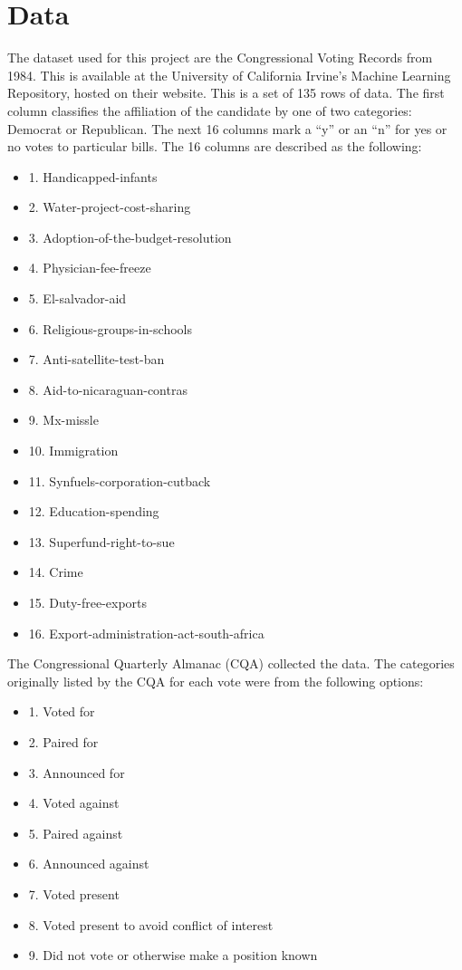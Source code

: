 \documentclass{article}
\begin{document}
%
\section{Data}
    The dataset used for this project are the Congressional Voting Records from 1984. This is available at the University of California Irvine’s Machine Learning Repository, hosted on their website. This is a set of 135 rows of data. The first column classifies the affiliation of the candidate by one of two categories: Democrat or Republican. The next 16 columns mark a “y” or an “n” for yes or no votes to particular bills. The 16 columns are described as the following:
    \begin{itemize}
        \item 1. Handicapped-infants
        \item 2. Water-project-cost-sharing
        \item 3. Adoption-of-the-budget-resolution
        \item 4. Physician-fee-freeze
        \item 5. El-salvador-aid
        \item 6. Religious-groups-in-schools
        \item 7. Anti-satellite-test-ban
        \item 8. Aid-to-nicaraguan-contras
        \item 9. Mx-missle
        \item 10. Immigration
        \item 11. Synfuels-corporation-cutback
        \item 12. Education-spending
        \item 13. Superfund-right-to-sue
        \item 14. Crime
        \item 15. Duty-free-exports
        \item 16. Export-administration-act-south-africa
    \end{itemize}

The Congressional Quarterly Almanac (CQA) collected the data. The categories originally listed by the CQA for each vote were from the following options:
    \begin{itemize}
        \item 1. Voted for
        \item 2. Paired for
        \item 3. Announced for
        \item 4. Voted against
        \item 5. Paired against
        \item 6. Announced against
        \item 7. Voted present
        \item 8. Voted present to avoid conflict of interest
        \item 9. Did not vote or otherwise make a position known
        \end{itemize}
\end{document}
